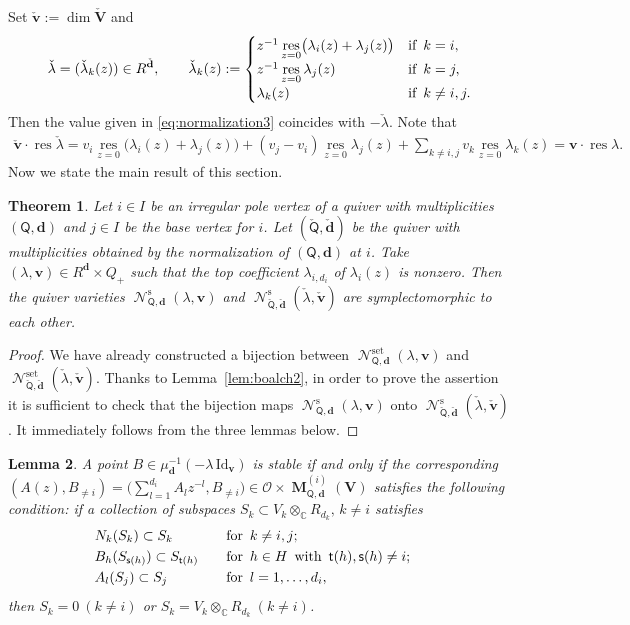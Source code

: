 \documentclass[pdftex]{sigma}
\numberwithin{equation}{section}
\newtheorem{Theorem}{Theorem}[section]
\newtheorem{Lemma}[Theorem]{Lemma}
\theoremstyle{definition}
\newcommand{\lemref}[1]{Lemma~\ref{#1}}
\newcommand{\C}{\mathbb{C}} %
\newcommand{\unit}{\mathrm{Id}}
\newcommand{\bM}{\operatorname{\mathbf{M}}}
\newcommand{\bV}{\mathbf{V}}
\newcommand{\bv}{\mathbf{v}}
\newcommand{\res}{\operatorname*{res}}
\newcommand{\ved}{\mathbf{d}}
\newcommand{\bO}{\mathcal{O}}
\newcommand{\hquad}{\hspace{.5em}}
\newcommand{\Qst}{\operatorname{\mathscr{N}}^\mathrm{s}}
\newcommand{\Qset}{\operatorname{\mathscr{N}}^\mathrm{set}}
\newcommand{\vin}{\mathsf{t}} %
\newcommand{\vout}{\mathsf{s}} %
\newcommand{\QQ}{\mathsf{Q}} %
\begin{document}
Set $\check{\bv} := \dim \check{\bV}$ and
\[
\check{\lambda}=(\check{\lambda}_k(z)) \in R^{\check{\ved}},\qquad
\check{\lambda}_k(z) :=
\begin{cases}
z^{-1}\res\limits_{z=0}\bigl( \lambda_i(z)+\lambda_j(z) \bigr) & \text{if}\hquad k=i, \\
z^{-1}\res\limits_{z=0} \lambda_j(z)  & \text{if}\hquad k=j, \\
\lambda_k(z) & \text{if}\hquad k \neq i,j.
\end{cases}
\]
Then the value given in \eqref{eq:normalization3}
coincides with $-\check{\lambda}$.
Note that
\begin{gather}
\check{\bv} \cdot \res \check{\lambda}
 = v_i \res_{z=0} \bigl( \lambda_i(z) +\lambda_j(z) \bigr)
+ (v_j-v_i) \res_{z=0} \lambda_j(z)
+ \sum_{k \neq i,j} v_k \res_{z=0} \lambda_k(z)
 = \bv \cdot \res \lambda.\label{eq:product}
\end{gather}
Now we state the main result of this section.

\begin{Theorem}\label{thm:normalization}
Let $i \in I$ be an irregular pole vertex
of a quiver with multiplicities $(\QQ,\ved)$
and $j \in I$ be the base vertex for $i$.
Let $(\check{\QQ},\check{\ved})$ be the quiver with multiplicities
obtained by the normalization of $(\QQ,\ved)$ at $i$.
Take $(\lambda, \bv) \in R^\ved \times Q_+$
such that
the top coefficient $\lambda_{i,d_i}$
of $\lambda_i(z)$ is nonzero.
Then the quiver varieties $\Qst_{\QQ,\ved}(\lambda,\bv)$
and $\Qst_{\check{\QQ},\check{\ved}}(\check{\lambda},\check{\bv})$
are symplectomorphic to each other.
\end{Theorem}

\begin{proof}
We have already constructed a bijection between
$\Qset_{\QQ,\ved}(\lambda,\bv)$ and
$\Qset_{\check{\QQ},\check{\ved}}(\check{\lambda},\check{\bv})$.
Thanks to \lemref{lem:boalch2},
in order to prove the assertion
it is suf\/f\/icient to
check that the bijection maps $\Qst_{\QQ,\ved}(\lambda,\bv)$
onto $\Qst_{\check{\QQ},\check{\ved}}(\check{\lambda},\check{\bv})$.
It immediately follows from the three lemmas below.
\end{proof}

\begin{Lemma}\label{lem:normalirred1}
A point $B \in \mu_\ved^{-1}(-\lambda\,\unit_\bv)$
is stable if and only if the corresponding
$(A(z),B_{\neq i})=\Big(\sum\limits_{l=1}^{d_i}A_lz^{-l}, B_{\neq i}\Big)
\in \bO \times \bM^{(i)}_{\QQ,\ved}(\bV)$
satisfies the following condition:
if a collection of subspaces
$S_k \subset V_k \otimes_\C R_{d_k},\, k \neq i$
satisfies
\begin{alignat}{3}
& N_k(S_k) \subset S_k \quad &&\text{for}\hquad k \neq i,j;& \notag\\
& B_h(S_{\vout(h)}) \subset S_{\vin(h)}
\quad & &\text{for}\hquad h \in H
\hquad\text{with}\hquad \vin(h), \vout(h) \neq i;&
\label{eq:normalirred1}\\
& A_l(S_j) \subset S_j \quad && \text{for}\hquad l=1, \dots ,d_i, & \notag
\end{alignat}
then $S_k=0\ (k \neq i)$ or
$S_k =V_k \otimes_\C R_{d_k}\ (k \neq i)$.
\end{Lemma}
\end{document}
